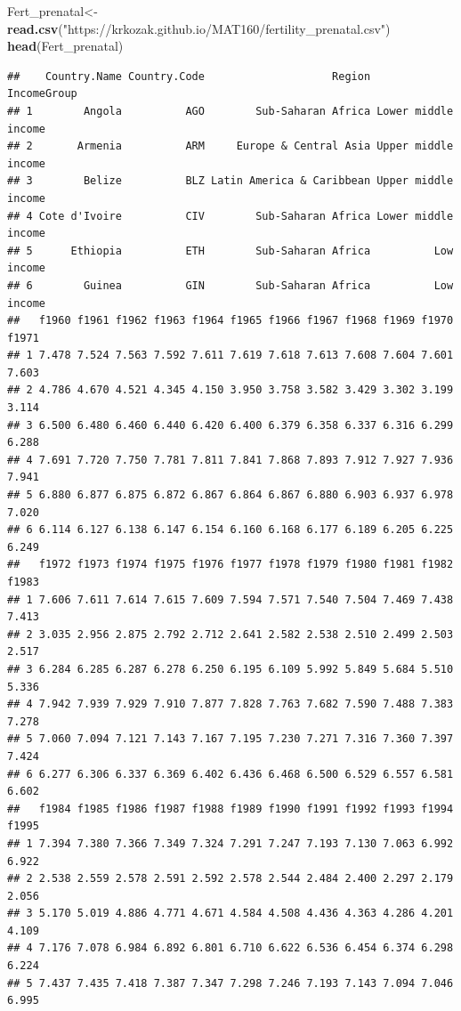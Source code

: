 \documentclass[]{book}
\newenvironment{Shaded}{\begin{snugshade}}{\end{snugshade}}
\newcommand{\KeywordTok}[1]{\textcolor[rgb]{0.13,0.29,0.53}{\textbf{#1}}}
\newcommand{\NormalTok}[1]{#1}
\newcommand{\StringTok}[1]{\textcolor[rgb]{0.31,0.60,0.02}{#1}}
\begin{document}
\begin{Shaded}
\begin{Highlighting}[]
\NormalTok{Fert_prenatal<-}\StringTok{ }\KeywordTok{read.csv}\NormalTok{(}\StringTok{"https://krkozak.github.io/MAT160/fertility_prenatal.csv"}\NormalTok{)}
\KeywordTok{head}\NormalTok{(Fert_prenatal)}
\end{Highlighting}
\end{Shaded}

\begin{verbatim}
##    Country.Name Country.Code                    Region         IncomeGroup
## 1        Angola          AGO        Sub-Saharan Africa Lower middle income
## 2       Armenia          ARM     Europe & Central Asia Upper middle income
## 3        Belize          BLZ Latin America & Caribbean Upper middle income
## 4 Cote d'Ivoire          CIV        Sub-Saharan Africa Lower middle income
## 5      Ethiopia          ETH        Sub-Saharan Africa          Low income
## 6        Guinea          GIN        Sub-Saharan Africa          Low income
##   f1960 f1961 f1962 f1963 f1964 f1965 f1966 f1967 f1968 f1969 f1970 f1971
## 1 7.478 7.524 7.563 7.592 7.611 7.619 7.618 7.613 7.608 7.604 7.601 7.603
## 2 4.786 4.670 4.521 4.345 4.150 3.950 3.758 3.582 3.429 3.302 3.199 3.114
## 3 6.500 6.480 6.460 6.440 6.420 6.400 6.379 6.358 6.337 6.316 6.299 6.288
## 4 7.691 7.720 7.750 7.781 7.811 7.841 7.868 7.893 7.912 7.927 7.936 7.941
## 5 6.880 6.877 6.875 6.872 6.867 6.864 6.867 6.880 6.903 6.937 6.978 7.020
## 6 6.114 6.127 6.138 6.147 6.154 6.160 6.168 6.177 6.189 6.205 6.225 6.249
##   f1972 f1973 f1974 f1975 f1976 f1977 f1978 f1979 f1980 f1981 f1982 f1983
## 1 7.606 7.611 7.614 7.615 7.609 7.594 7.571 7.540 7.504 7.469 7.438 7.413
## 2 3.035 2.956 2.875 2.792 2.712 2.641 2.582 2.538 2.510 2.499 2.503 2.517
## 3 6.284 6.285 6.287 6.278 6.250 6.195 6.109 5.992 5.849 5.684 5.510 5.336
## 4 7.942 7.939 7.929 7.910 7.877 7.828 7.763 7.682 7.590 7.488 7.383 7.278
## 5 7.060 7.094 7.121 7.143 7.167 7.195 7.230 7.271 7.316 7.360 7.397 7.424
## 6 6.277 6.306 6.337 6.369 6.402 6.436 6.468 6.500 6.529 6.557 6.581 6.602
##   f1984 f1985 f1986 f1987 f1988 f1989 f1990 f1991 f1992 f1993 f1994 f1995
## 1 7.394 7.380 7.366 7.349 7.324 7.291 7.247 7.193 7.130 7.063 6.992 6.922
## 2 2.538 2.559 2.578 2.591 2.592 2.578 2.544 2.484 2.400 2.297 2.179 2.056
## 3 5.170 5.019 4.886 4.771 4.671 4.584 4.508 4.436 4.363 4.286 4.201 4.109
## 4 7.176 7.078 6.984 6.892 6.801 6.710 6.622 6.536 6.454 6.374 6.298 6.224
## 5 7.437 7.435 7.418 7.387 7.347 7.298 7.246 7.193 7.143 7.094 7.046 6.995

\end{verbatim}
\end{document}

